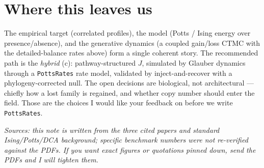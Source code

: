 \documentclass[11pt, oneside]{article}
\begin{document}
\section{Where this leaves us}

The empirical target (correlated profiles), the model (Potts / Ising energy over
presence/absence), and the generative dynamics (a coupled gain/loss CTMC with the
detailed-balance rates above) form a single coherent story. The recommended path is the
\emph{hybrid} (c): pathway-structured $J$, simulated by Glauber dynamics through a
\texttt{PottsRates} rate model, validated by inject-and-recover with a phylogeny-corrected null.
The open decisions are biological, not architectural --- chiefly how a lost family is regained,
and whether copy number should enter the field. Those are the choices I would like your feedback
on before we write \texttt{PottsRates}.

\vspace{2pt}
\footnotesize\textit{Sources: this note is written from the three cited papers and standard
Ising/Potts/DCA background; specific benchmark numbers were not re-verified against the PDFs. If
you want exact figures or quotations pinned down, send the PDFs and I will tighten them.}
\end{document}
